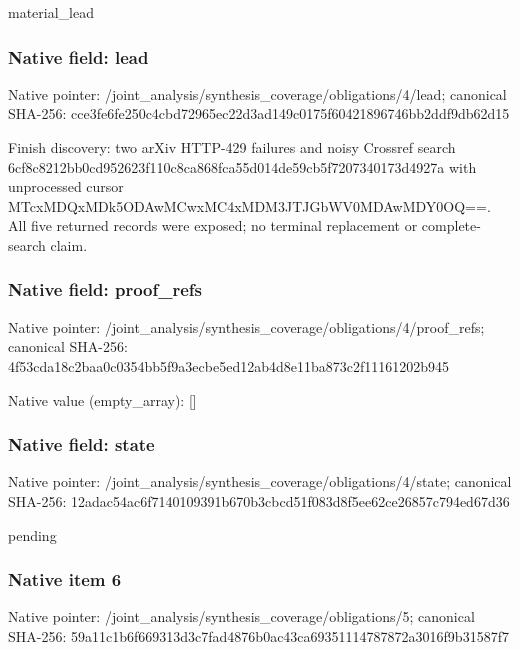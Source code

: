 \documentclass[10pt,a4paper]{article}
\begin{document}
\begingroup\raggedright\sloppy material\_\allowbreak{}lead\par\endgroup

\subsubsection{Native field: lead}
Native pointer: /joint\_\allowbreak{}analysis/synthesis\_\allowbreak{}coverage/obligations/4/lead; canonical SHA-256: cce3fe6fe250c4cbd72965ec22d3ad149c0175f60421896746bb2ddf9db62d15

\begingroup\raggedright\sloppy Finish discovery:\allowbreak{} two arXiv HTTP-429 failures and noisy Crossref search 6cf8c8212bb0cd952623f110c8ca868fca55d014de59cb5f7207340173d4927a with unprocessed cursor MTcxMDQxMDk5ODAwMCwxMC4xMDM3JTJGbWV0MDAwMDY0OQ=\allowbreak{}=\allowbreak{}. All five returned records were exposed;\allowbreak{} no terminal replacement or complete-search claim.\par\endgroup

\subsubsection{Native field: proof\_\allowbreak{}refs}
Native pointer: /joint\_\allowbreak{}analysis/synthesis\_\allowbreak{}coverage/obligations/4/proof\_\allowbreak{}refs; canonical SHA-256: 4f53cda18c2baa0c0354bb5f9a3ecbe5ed12ab4d8e11ba873c2f11161202b945

Native value (empty\_\allowbreak{}array): []

\subsubsection{Native field: state}
Native pointer: /joint\_\allowbreak{}analysis/synthesis\_\allowbreak{}coverage/obligations/4/state; canonical SHA-256: 12adac54ac6f7140109391b670b3cbcd51f083d8f5ee62ce26857c794ed67d36

\begingroup\raggedright\sloppy pending\par\endgroup

\subsubsection{Native item 6}
Native pointer: /joint\_\allowbreak{}analysis/synthesis\_\allowbreak{}coverage/obligations/5; canonical SHA-256: 59a11c1b6f669313d3c7fad4876b0ac43ca69351114787872a3016f9b31587f7
\end{document}
